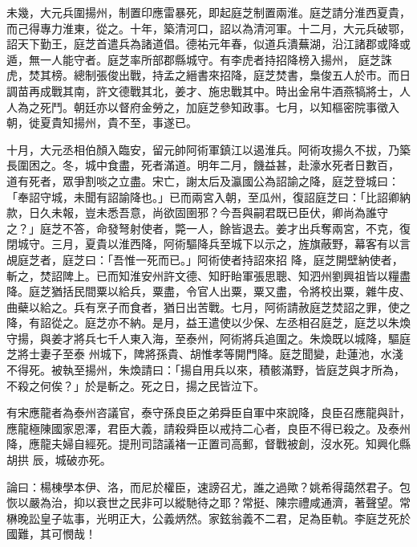 \begin{pinyinscope}
 未幾，大元兵圍揚州，制置印應雷暴死，即起庭芝制置兩淮。庭芝請分淮西夏貴，而己得專力淮東，從之。十年，築清河口，詔以為清河軍。十二月，大元兵破鄂，詔天下勤王，庭芝首遣兵為諸道倡。德祐元年春，似道兵潰蕪湖，沿江諸郡或降或遁，無一人能守者。庭芝率所部郡縣城守。有李虎者持招降榜入揚州，
 庭芝誅虎，焚其榜。總制張俊出戰，持孟之縉書來招降，庭芝焚書，梟俊五人於市。而日調苗再成戰其南，許文德戰其北，姜才、施忠戰其中。時出金帛牛酒燕犒將士，人人為之死鬥。朝廷亦以督府金勞之，加庭芝參知政事。七月，以知樞密院事徵入朝，徙夏貴知揚州，貴不至，事遂已。



 十月，大元丞相伯顏入臨安，留元帥阿術軍鎮江以遏淮兵。阿術攻揚久不拔，乃築長圍困之。冬，城中食盡，死者滿道。明年二月，饑益甚，赴濠水死者日數百，
 道有死者，眾爭割啖之立盡。宋亡，謝太后及瀛國公為詔諭之降，庭芝登城曰：「奉詔守城，未聞有詔諭降也。」已而兩宮入朝，至瓜州，復詔庭芝曰：「比詔卿納款，日久未報，豈未悉吾意，尚欲固圉邪？今吾與嗣君既已臣伏，卿尚為誰守之？」庭芝不答，命發弩射使者，斃一人，餘皆退去。姜才出兵奪兩宮，不克，復閉城守。三月，夏貴以淮西降，阿術驅降兵至城下以示之，旌旗蔽野，幕客有以言覘庭芝者，庭芝曰：「吾惟一死而已。」阿術使者持詔來招
 降，庭芝開壁納使者，斬之，焚詔陴上。已而知淮安州許文德、知盱眙軍張思聰、知泗州劉興祖皆以糧盡降。庭芝猶括民間粟以給兵，粟盡，令官人出粟，粟又盡，令將校出粟，雜牛皮、曲蘗以給之。兵有烹子而食者，猶日出苦戰。七月，阿術請赦庭芝焚詔之罪，使之降，有詔從之。庭芝亦不納。是月，益王遣使以少保、左丞相召庭芝，庭芝以朱煥守揚，與姜才將兵七千人東入海，至泰州，阿術將兵追圍之。朱煥既以城降，驅庭芝將士妻子至泰
 州城下，陴將孫貴、胡惟孝等開門降。庭芝聞變，赴蓮池，水淺不得死。被執至揚州，朱煥請曰：「揚自用兵以來，積骸滿野，皆庭芝與才所為，不殺之何俟？」於是斬之。死之日，揚之民皆泣下。



 有宋應龍者為泰州咨議官，泰守孫良臣之弟舜臣自軍中來說降，良臣召應龍與計，應龍極陳國家恩澤，君臣大義，請殺舜臣以戒持二心者，良臣不得已殺之。及泰州降，應龍夫婦自經死。提刑司諮議褚一正置司高郵，督戰被創，沒水死。知興化縣胡拱
 辰，城破亦死。



 論曰：楊棟學本伊、洛，而尼於權臣，速謗召尤，誰之過歟？姚希得藹然君子。包恢以嚴為治，抑以衰世之民非可以縱馳待之耶？常挺、陳宗禮咸通濟，著聲望。常楙晚訟皇子竑事，光明正大，公義炳然。家鉉翁義不二君，足為臣軌。李庭芝死於國難，其可憫哉！



\end{pinyinscope}